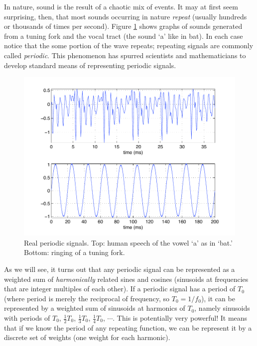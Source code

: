 In nature, sound is the result of a chaotic mix of events. It may at first seem surprising, then, that most sounds occurring in nature \emph{repeat} (usually hundreds or thousands of times per second). Figure \ref{fg:periodicexample} shows graphs of sounds generated from a tuning fork and the vocal tract (the sound `a' like in bat). In each case notice that the some portion of the wave repeats; repeating signals are commonly called \emph{periodic}. This phenomenon has spurred scientists and mathematicians to develop standard means of representing periodic signals. 
\begin{figure}
\centerline{\includegraphics[width=\textwidth]{ch-physical/periodic-examples}}
\caption[Real periodic signals]{Real periodic signals. Top: human speech of the vowel `a' as in `bat.' Bottom: ringing of a tuning fork. \label{fg:periodicexample}}
\end{figure}

As we will see, it turns out that any periodic signal can be
represented as a weighted sum of \emph{harmonically} 
related sines and cosines (sinusoids at frequencies that are integer
multiples of each other). If a periodic signal has a period of $T_0$
(where period is merely the reciprocal of frequency, so $T_0 =
1/f_0$), it can be represented by a weighted sum of sinusoids at
harmonics of $T_0$, namely sinusoids with periods of $T_0$,
$\frac{1}{2}T_0$, $\frac{1}{3}T_0$, $\frac{1}{4}T_0$, $\cdots$. This
is potentially very powerful! It means that if we know the period of
any repeating function, we can be represent it by a discrete set of
weights (one weight for each harmonic).


